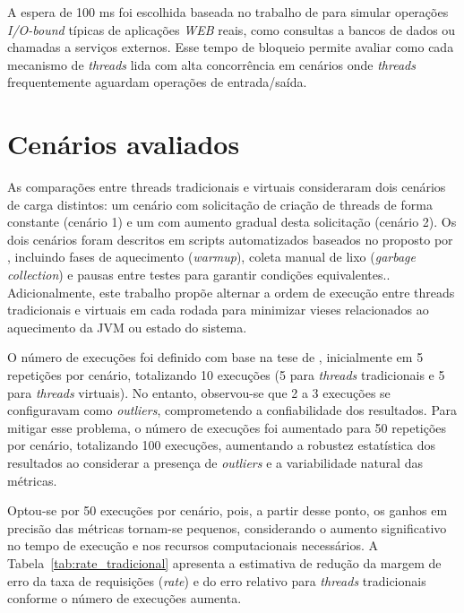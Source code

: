 \documentclass[12pt, openright, oneside, a4paper, english,	french,	spanish, brazil	]{abntex2}
\begin{document}
    A espera de 100 ms foi escolhida baseada no trabalho de  para simular operações \textit{I/O-bound} típicas de aplicações \textit{WEB} reais, como consultas a bancos de dados ou chamadas a serviços externos. Esse tempo de bloqueio permite avaliar como cada mecanismo de \textit{threads} lida com alta concorrência em cenários onde \textit{threads} frequentemente aguardam operações de entrada/saída.

    \section{Cenários avaliados}
    As comparações entre threads tradicionais e virtuais consideraram dois cenários de carga distintos: um cenário com solicitação de criação de threads de forma constante (cenário 1) e um com aumento gradual desta solicitação (cenário 2). Os dois cenários foram descritos em scripts automatizados baseados no proposto por , incluindo fases de aquecimento (\textit{warmup}), coleta manual de lixo (\textit{garbage collection}) e pausas entre testes para garantir condições equivalentes.. Adicionalmente, este trabalho propõe alternar a ordem de execução entre threads tradicionais e virtuais em cada rodada para minimizar vieses relacionados ao aquecimento da JVM ou estado do sistema.

     O número de execuções foi definido com base na tese de , inicialmente em 5 repetições por cenário, totalizando 10 execuções (5 para \textit{threads} tradicionais e 5 para \textit{threads} virtuais). No entanto, observou-se que 2 a 3 execuções se configuravam como \textit{outliers}, comprometendo a confiabilidade dos resultados. Para mitigar esse problema, o número de execuções foi aumentado para 50 repetições por cenário, totalizando 100 execuções, aumentando a robustez estatística dos resultados ao considerar a presença de \textit{outliers} e a variabilidade natural das métricas.

    Optou-se por 50 execuções por cenário, pois, a partir desse ponto, os ganhos em precisão das métricas tornam-se pequenos, considerando o aumento significativo no tempo de execução e nos recursos computacionais necessários.
    A Tabela~\ref{tab:rate_tradicional} apresenta a estimativa de redução da margem de erro da taxa de requisições (\textit{rate}) e do erro relativo para \textit{threads} tradicionais conforme o número de execuções aumenta. 
\end{document}
